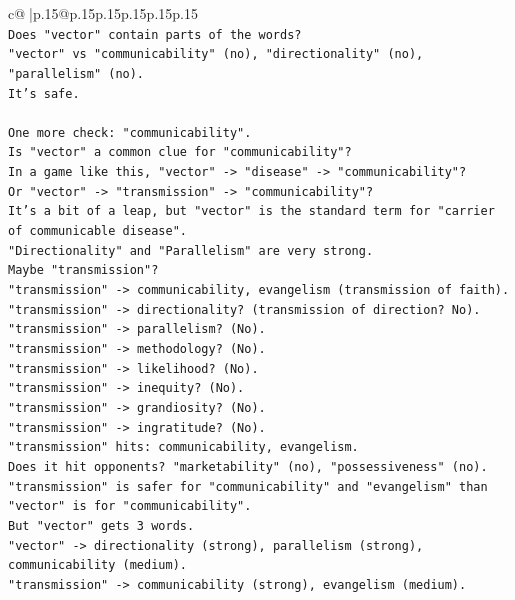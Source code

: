 \documentclass{article}
\begin{document}
{\begin{supertabular}{c@{$\;$}|p{.15\linewidth}@{}p{.15\linewidth}p{.15\linewidth}p{.15\linewidth}p{.15\linewidth}p{.15\linewidth}}
{{{\\ 
\texttt{Does "vector" contain parts of the words?} \\
\texttt{"vector" vs "communicability" (no), "directionality" (no), "parallelism" (no).} \\
\texttt{It's safe.} \\
\\ 
\texttt{One more check: "communicability".} \\
\texttt{Is "vector" a common clue for "communicability"?} \\
\texttt{In a game like this, "vector" {-}> "disease" {-}> "communicability"?} \\
\texttt{Or "vector" {-}> "transmission" {-}> "communicability"?} \\
\texttt{It's a bit of a leap, but "vector" is the standard term for "carrier of communicable disease".} \\
\texttt{"Directionality" and "Parallelism" are very strong.} \\
\texttt{Maybe "transmission"?} \\
\texttt{"transmission" {-}> communicability, evangelism (transmission of faith).} \\
\texttt{"transmission" {-}> directionality? (transmission of direction? No).} \\
\texttt{"transmission" {-}> parallelism? (No).} \\
\texttt{"transmission" {-}> methodology? (No).} \\
\texttt{"transmission" {-}> likelihood? (No).} \\
\texttt{"transmission" {-}> inequity? (No).} \\
\texttt{"transmission" {-}> grandiosity? (No).} \\
\texttt{"transmission" {-}> ingratitude? (No).} \\
\texttt{"transmission" hits: communicability, evangelism.} \\
\texttt{Does it hit opponents? "marketability" (no), "possessiveness" (no).} \\
\texttt{"transmission" is safer for "communicability" and "evangelism" than "vector" is for "communicability".} \\
\texttt{But "vector" gets 3 words.} \\
\texttt{"vector" {-}> directionality (strong), parallelism (strong), communicability (medium).} \\
\texttt{"transmission" {-}> communicability (strong), evangelism (medium).} \\
}}}
\end{supertabular}}
\end{document}
